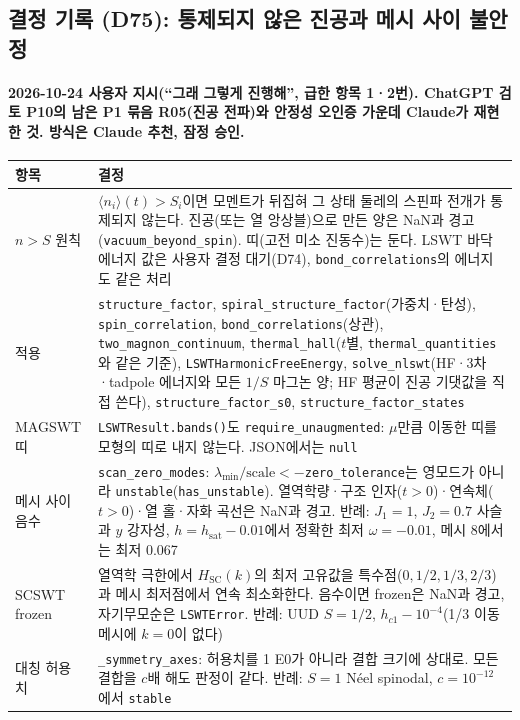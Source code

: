 \subsection{결정 기록 (D75): 통제되지 않은 진공과 메시 사이 불안정}\label{decisions-d75-vacuum-stability}
\begingroup%
  \framesubtitle{2026-10-24 사용자 지시(``그래 그렇게 진행해'', 급한 항목 1·2번). ChatGPT 검토 P10의 남은 P1 묶음 R05(진공 전파)와 안정성 오인증 가운데 Claude가 재현한 것. 방식은 Claude 추천, 잠정 승인.}
  \small\renewcommand{\arraystretch}{1.12}
  \begin{tabularx}{\textwidth}{@{}P{3.0cm}Y@{}}
    \toprule
    항목 & 결정 \\
    \midrule
    $n>S$ 원칙 & $\langle n_i\rangle(t)>S_i$이면 모멘트가 뒤집혀 그 상태 둘레의 스핀파 전개가 통제되지 않는다. 진공(또는 열 앙상블)으로 만든 양은 NaN과 경고(\texttt{vacuum\_beyond\_spin}). 띠(고전 미소 진동수)는 둔다. LSWT 바닥 에너지 값은 사용자 결정 대기(D74), \texttt{bond\_correlations}의 에너지도 같은 처리 \\
    적용 & \texttt{structure\_factor}, \texttt{spiral\_structure\_factor}(가중치·탄성), \texttt{spin\_correlation}, \texttt{bond\_correlations}(상관), \texttt{two\_magnon\_continuum}, \texttt{thermal\_hall}($t$별, \texttt{thermal\_quantities}와 같은 기준), \texttt{LSWTHarmonicFreeEnergy}, \texttt{solve\_nlswt}(HF·3차·tadpole 에너지와 모든 $1/S$ 마그논 양; HF 평균이 진공 기댓값을 직접 쓴다), \texttt{structure\_factor\_s0}, \texttt{structure\_factor\_states} \\
    MAGSWT 띠 & \texttt{LSWTResult.bands()}도 \texttt{require\_unaugmented}: $\mu$만큼 이동한 띠를 모형의 띠로 내지 않는다. JSON에서는 \texttt{null} \\
    메시 사이 음수 & \texttt{scan\_zero\_modes}: $\lambda_\mathrm{min}/\mathrm{scale}<-$\texttt{zero\_tolerance}는 영모드가 아니라 \texttt{unstable}(\texttt{has\_unstable}). 열역학량·구조 인자($t>0$)·연속체($t>0$)·열 홀·자화 곡선은 NaN과 경고. 반례: $J_1=1$, $J_2=0.7$ 사슬과 $y$ 강자성, $h=h_\mathrm{sat}-0.01$에서 정확한 최저 $\omega=-0.01$, 메시 8에서는 최저 0.067 \\
    SCSWT frozen & 열역학 극한에서 $H_\mathrm{SC}(k)$의 최저 고유값을 특수점($0,1/2,1/3,2/3$)과 메시 최저점에서 연속 최소화한다. 음수이면 frozen은 NaN과 경고, 자기무모순은 \texttt{LSWTError}. 반례: UUD $S=1/2$, $h_{c1}-10^{-4}$(1/3 이동 메시에 $k=0$이 없다) \\
    대칭 허용치 & \texttt{\_symmetry\_axes}: 허용치를 1 E0가 아니라 결합 크기에 상대로. 모든 결합을 $c$배 해도 판정이 같다. 반례: $S=1$ Néel spinodal, $c=10^{-12}$에서 \texttt{stable} \\

\end{tabularx}
